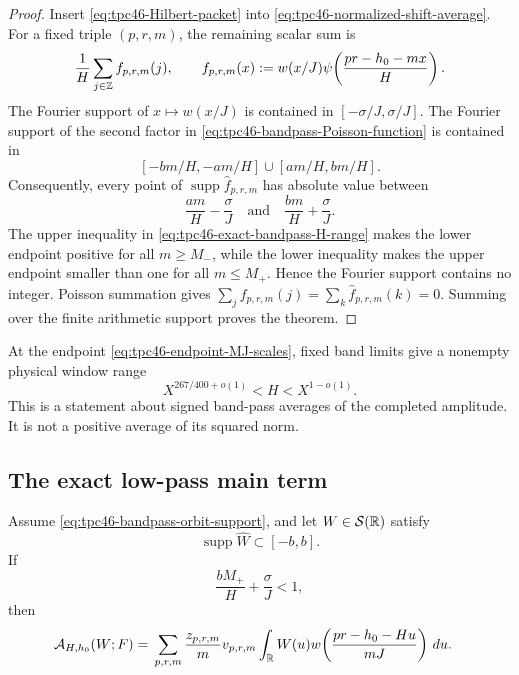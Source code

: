 \begin{proof}
Insert \eqref{eq:tpc46-Hilbert-packet} into
\eqref{eq:tpc46-normalized-shift-average}.  For a fixed triple
\((p,r,m)\), the remaining scalar sum is
\begin{equation}
 \frac1H\sum_{j\in\mathbb Z}f_{p,r,m}(j),
 \qquad
 f_{p,r,m}(x)
 :=w(x/J)\psi\!\left(\frac{pr-h_0-mx}{H}\right).
 \label{eq:tpc46-bandpass-Poisson-function}
\end{equation}
The Fourier support of \(x\mapsto w(x/J)\) is contained in
\([ -\sigma/J,\sigma/J]\).  The Fourier support of the second factor
in \eqref{eq:tpc46-bandpass-Poisson-function} is contained in
\[
 [-bm/H,-am/H]\cup[am/H,bm/H].
\]
Consequently, every point of
\(\operatorname{supp}\widehat f_{p,r,m}\) has absolute value between
\[
 \frac{am}{H}-\frac{\sigma}{J}
 \quad\text{and}\quad
 \frac{bm}{H}+\frac{\sigma}{J}.
\]
The upper inequality in \eqref{eq:tpc46-exact-bandpass-H-range} makes
the lower endpoint positive for all \(m\ge M_-\), while the lower
inequality makes the upper endpoint smaller than one for all
\(m\le M_+\).  Hence the Fourier support contains no integer.  Poisson
summation gives
\(\sum_jf_{p,r,m}(j)=\sum_k\widehat f_{p,r,m}(k)=0\).
Summing over the finite arithmetic support proves the theorem.
\end{proof}

At the endpoint \eqref{eq:tpc46-endpoint-MJ-scales}, fixed band limits
give a nonempty physical window range
\begin{equation}
 X^{267/400+o(1)}<H<X^{1-o(1)}.
 \label{eq:tpc46-endpoint-bandpass-window-range}
\end{equation}
This is a statement about signed band-pass averages of the completed
amplitude.  It is not a positive average of its squared norm.

\subsection{The exact low-pass main term}

\begin{theorem}
\label{thm:tpc46-exact-lowpass-formula}
Assume \eqref{eq:tpc46-bandpass-orbit-support}, and let
\(W\in\mathcal S(\mathbb R)\) satisfy
\begin{equation}
 \operatorname{supp}\widehat W\subset[-b,b].
 \label{eq:tpc46-lowpass-window-support}
\end{equation}
If
\begin{equation}
 \frac{bM_+}{H}+\frac{\sigma}{J}<1,
 \label{eq:tpc46-lowpass-no-alias-condition}
\end{equation}
then
\begin{align}
 \mathcal A_{H,h_0}(W;F)
 ={}&\sum_{p,r,m}
 \frac{z_{p,r,m}}{m}v_{p,r,m}
 \int_{\mathbb R}W(u)
 w\!\left(\frac{pr-h_0-Hu}{mJ}\right)\,du.
 \label{eq:tpc46-exact-lowpass-main}
\end{align}
\end{theorem}

